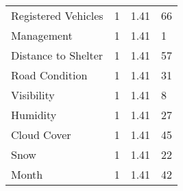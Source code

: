 \begin{longtable}[c]{p{3.5cm}p{2.0cm}p{2.5cm}p{5.5cm}}
  Registered Vehicles &   1 & 1.41 & 66 \\ 
  Management &   1 & 1.41 & 1 \\ 
  Distance to Shelter &   1 & 1.41 & 57 \\ 
  Road Condition &   1 & 1.41 & 31 \\ 
  Visibility &   1 & 1.41 & 8 \\ 
  Humidity &   1 & 1.41 & 27 \\ 
  Cloud Cover &   1 & 1.41 & 45 \\ 
  Snow &   1 & 1.41 & 22 \\ 
  Month &   1 & 1.41 & 42 \\ 
   \hline
\end{longtable}


%